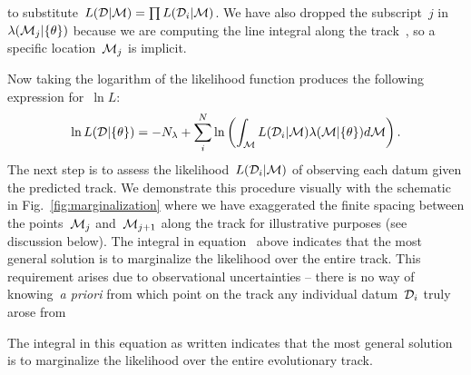 \documentclass[ms.tex]{subfiles}
\begin{document}
to substitute~$L(\mathcal{D} | \mathcal{M}) = \prod L(\mathcal{D}_i |
\mathcal{M})$.
We have also dropped the subscript~$j$ in~$\lambda(\mathcal{M}_j | \{\theta\})$
because we are computing the line integral along the track~, so a
specific location~$\mathcal{M}_j$ is implicit.
\par
Now taking the logarithm of the likelihood function produces the following
expression for~$\ln L$:
\begin{equation}
\ln L(\mathcal{D} | \{\theta\}) = -N_\lambda + \sum_i^N \ln \left(
\int_{\mathcal{M}} L(\mathcal{D}_i | \mathcal{M})\lambda(\mathcal{M} | \{\theta\})
d\mathcal{M}
\right).
\label{eq:lnL_with_integral}
\end{equation}
The next step is to assess the likelihood~$L(\mathcal{D}_i | \mathcal{M})$ of
observing each datum given the predicted track.
We demonstrate this procedure visually with the schematic in
Fig.~\ref{fig:marginalization} where we have exaggerated the finite spacing
between the points~$\mathcal{M}_j$ and~$\mathcal{M}_{j + 1}$ along the track for
illustrative purposes (see discussion below).
The integral in equation~ above indicates that the
most general solution is to marginalize the likelihood over the entire track.
This requirement arises due to observational uncertainties -- there is no way
of knowing~\textit{a priori} from which point on the track any individual
datum~$\mathcal{D}_i$ truly arose from

The integral in this equation as written indicates that the most general
solution is to marginalize the likelihood over the entire evolutionary track.
\end{document}
